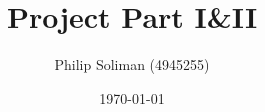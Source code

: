 \documentclass[11pt]{report}
\title{Project Part I\&II}
\author{Philip Soliman (4945255)}
\date{\today}
\begin{document}
\cite{random_article}
\maketitle



\newpage


\newpage
\printbibliography
\end{document}
